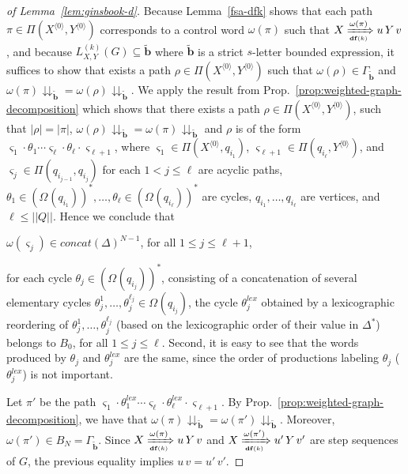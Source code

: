 \documentclass[final]{llncs}
\def\tuple#1{{\langle #1 \rangle}}
\def\card#1{{|\!|{#1}|\!|}}
\def\len#1{{\vert{#1}\vert}}
\def\prod{\Delta}
\def\patt{{\widetilde{\mathbf{b}}}}
\def\pattg{{\Gamma_\patt}}
\def\df#1{\scriptscriptstyle\mathbf{df}(#1)}
\newcommand{\cycles}[2]{\Omega_{{#1}}({#2})}
\newcommand{\cyclestar}[2]{(\Omega_{{#1}}({#2}))^*}
\newcommand{\projpatt}[1]{{#1}\mathclose{\downdownarrows}_{{\patt}}}
\begin{document}
\begin{proof}[of Lemma~\ref{lem:ginsbook-d}]
Because Lemma~\ref{fsa-dfk} shows that each
path \(\pi \in \Pi( X^{\tuple{0}}, Y^{\tuple{0}} ) \) corresponds to a
control word \(\omega(\pi)\) such
that \(X \xRightarrow[\df{k}]{\omega(\pi)} u\, Y\, v\), and because \( L_{X,Y}^{(k)}(G)\subseteq \patt\) where \(\patt\) is a
strict \(s\)-letter bounded expression, it suffices to show that
exists a path \(\rho \in \Pi( X^{\tuple{0}}, Y^{\tuple{0}} ) \) such
that \(\omega(\rho) \in \pattg\)
and \( \projpatt{\omega(\pi)} = \projpatt{\omega(\rho)}\).
We apply the result from Prop.~\ref{prop:weighted-graph-decomposition}
which shows that there exists a path
\(\rho \in \Pi( X^{\tuple{0}}, Y^{\tuple{0}} )\), such that $\len{\rho} = \len{\pi}$,
$\projpatt{\omega(\rho)} = \projpatt{\omega(\pi)}$ and $\rho$ is of
the form
$\varsigma_1 \cdot \theta_1 \cdots \varsigma_\ell \cdot \theta_\ell \cdot
\varsigma_{\ell+1}$, where 
\(\varsigma_1     \in \Pi(X^{\tuple{0}},q_{i_1})\), 
\(\varsigma_{\ell+1} \in \Pi(q_{i_\ell}, Y^{\tuple{0}})\), and 
\(\varsigma_{j}   \in \Pi(q_{i_{j-1}},q_{i_{j}})\) for each \(1< j \leq \ell\)
are acyclic paths,
$\theta_1 \in \cyclestar{}{q_{i_1}}, \ldots, \theta_\ell \in \cyclestar{}{q_{i_\ell}}$
are cycles, $q_{i_1}, \ldots, q_{i_{\ell}}$ are vertices, and
$\ell \leq \card{Q}$. Hence we conclude that
\begin{compactitem}
\item $\omega(\varsigma_j) \in \mathit{concat}(\prod)^{N-1}$, for all $1 \leq j \leq \ell+1$, 
\item for each cycle $\theta_j \in \cyclestar{}{q_{i_j}}$, consisting of a concatenation of 
several elementary cycles
$\theta^1_j, \ldots, \theta^{\ell_j}_j \in \cycles{}{q_{i_j}}$, the cycle
$\theta^{lex}_j$ obtained by a lexicographic reordering of
$\theta^1_j, \ldots, \theta^{\ell_j}_j$ (based on the lexicographic order
of their value in $\prod^*$) belongs to $B_0$, for all $1 \leq j \leq
\ell$.  Second, it is easy to see that the words produced by $\theta_j$
and $\theta^{lex}_j$ are the same, since the order of productions
labeling $\theta_j$ ($\theta^{lex}_j$) is not important.
\end{compactitem}
Let $\pi'$ be the path
$\varsigma_1 \cdot \theta^{lex}_1 \cdots \varsigma_\ell \cdot \theta^{lex}_\ell \cdot
\varsigma_{\ell+1}$. By Prop.~\ref{prop:weighted-graph-decomposition}, we have that 
$\projpatt{\omega(\pi)} = \projpatt{\omega(\pi')}$.
Moreover, $\omega(\pi') \in B_N = \pattg$.  Since $X \xRightarrow[\df{k}]{\omega(\pi)} u \,
Y \, v$ and $X
\xRightarrow[\df{k}]{\omega(\pi')} u' \, Y \, v'$ are step sequences
of $G$, the previous equality implies $u \, v = u' \, v'$.


\end{proof}
\end{document}
